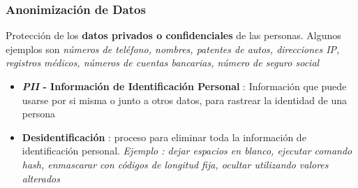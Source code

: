 \subsubsection{Anonimización de Datos}
Protección de los \textbf{datos privados o confidenciales} de las personas. Algunos ejemplos son \textit{números de teléfono, nombres, patentes de autos, direcciones IP, registros médicos, números de cuentas bancarias, número de seguro social}
\begin{itemize}
    \item {\textbf{\textit{PII} - Información de Identificación Personal} : Información que puede usarse por si misma o junto a otros datos, para rastrear la identidad de una persona}
    \item {\textbf{Desidentificación} : proceso para eliminar toda la información de identificación personal. \textit{Ejemplo : dejar espacios en blanco, ejecutar comando hash, enmascarar con códigos de longitud fija, ocultar utilizando valores alterados}}
\end{itemize}

\newpage
